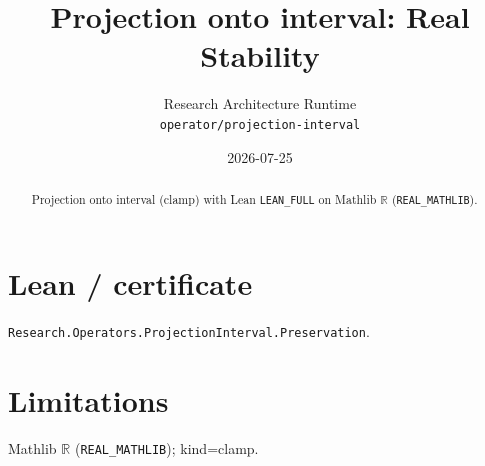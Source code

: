 \documentclass[11pt]{article}
\title{Projection onto interval: Real Stability}
\author{Research Architecture Runtime \\ \texttt{operator/projection-interval}}
\date{2026-07-25}
\begin{document}
\maketitle
\begin{abstract}
Projection onto interval (clamp) with Lean \texttt{LEAN\_FULL} on Mathlib $\mathbb{R}$ (\texttt{REAL\_MATHLIB}).
\end{abstract}
\section{Lean / certificate}
\texttt{Research.Operators.ProjectionInterval.Preservation}.
\section{Limitations}
Mathlib $\mathbb{R}$ (\texttt{REAL\_MATHLIB}); kind=clamp.
\end{document}
